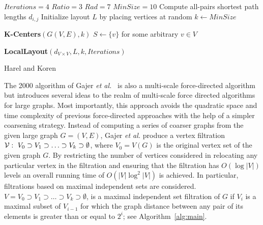 \documentclass[notitlepage,letter,11pt]{article}
\begin{document}
\begin{algorithm}
$Iterations=4$ 
$Ratio=3$ 
$Rad=7$ 
$MinSize=10$ 
Compute all-pairs shortest path lengths $d_{i,j}$\;
Initialize layout $L$ by placing vertices at random\;
$k\gets MinSize$\;
\;

{\bf K-Centers}$(G(V,E), k)$\;
$S \gets \{v\}$ for some arbitrary $v \in V$\;
\;

{\bf LocalLayout}$(d_{V\times V} , L, k, Iterations)$\;
\caption{Harel and Koren\label{alg:HK}}
\end{algorithm}

The 2000 algorithm of Gajer {\em et al.}~\cite{ggk-afmda-00j} is also a multi-scale force-directed
algorithm but introduces several ideas to the realm of multi-scale
force directed algorithms for large graphs. Most importantly, this
approach avoids the quadratic space and time complexity of previous
force-directed approaches with the help of a simpler coarsening
strategy. Instead of computing a series of coarser graphs from the
given large graph $G=(V,E)$, Gajer {\em et al.} produce a vertex
filtration ${\cal V}:\ V_0 \supset V_1 \supset \ldots \supset V_k
\supset
\emptyset$, where $V_0=V(G)$ is the original vertex set of the given
graph $G$. By restricting the number of vertices considered in
relocating any particular vertex in the filtration and ensuring that
the filtration has $O(\log |V|)$ levels an overall running time of
$O(|V|\log^2 |V|)$ is achieved. In particular, filtrations based on 
maximal independent sets are considered. $ V = V_0 \supset V_1 \supset \ldots \supset V_k \supset
\emptyset$, is a maximal independent set filtration of $G$ if $V_i$ is a maximal subset of $V_{i-1}$ for which the
graph distance between any pair of its elements is greater than or
equal to $2^i$; see Algorithm~\ref{alg:main}.
\end{document}
